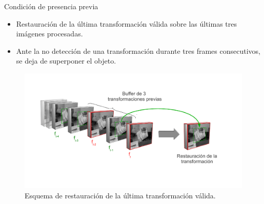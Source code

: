 \begin{frame}{Condición de presencia previa}
  
  \begin{itemize}
    \item Restauración de la última transformación válida sobre las últimas tres imágenes procesadas.
    \item Ante la no detección de una transformación durante tres frames consecutivos, se deja de superponer el objeto.
  \end{itemize}

  \begin{figure}[tbhp]
    \centering
	  \includegraphics[scale=0.6]{../../figs/restauracion_transfromacion}
       \caption[\small{Esquema de restauración de la última transformación válida}]{\small{Esquema de restauración de la última transformación válida.}}
    \label{fig:restauracion_transformacion} 
  \end{figure}
\end{frame}
